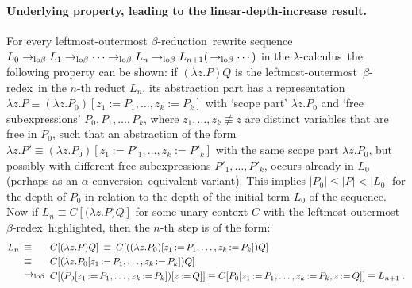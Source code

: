 \documentclass[
submission
]{dmtcs-episciences-tampered}
\newcommand{\indap}[2]{#1 _{#2}}
\newcommand{\nb}{\nobreakdash}
\newcommand{\nf}{\normalfont}
\newcommand{\sdefdby}{{:=}}
\newcommand{\punc}[1]{\ensuremath{\hspace*{3pt}{#1}}}
\newcommand{\cvar}{z}
\newcommand{\cvari}{\indap{\cvar}}
\newcommand{\cxtap}[2]{{#1}[#2]}
\newcommand{\acxt}{C}
\newcommand{\acxtap}{\cxtap{\acxt}}
\newcommand{\sdepth}{\text{\nf d}}
\newcommand{\depth}[1]{\lvert{#1}\rvert} \newcommand{\depthbig}[1]{\big\lvert{#1}\big\rvert} \newcommand{\sudepth}{\indap{\sdepth}{\text{\nf u}}}
\newcommand{\clter}{L}
\newcommand{\dlter}{P}
\newcommand{\elter}{Q}
\newcommand{\dlteracc}{\dlter'}
\newcommand{\clteri}{\indap{\clter}}
\newcommand{\dlteri}{\indap{\dlter}}
\newcommand{\dlteracci}{\indap{\dlteracc}}
\newcommand{\sslabs}{\lambda}
\newcommand{\slabs}[1]{\sslabs{#1}.}
\newcommand{\labs}[2]{\slabs{#1}{#2}}
\newcommand{\lapp}[2]{{#1}{#2}}
\newcommand{\substin}[2]{{#1}[{#2}]}
\newcommand{\sred}{\to}
\newcommand{\sredi}{\indap{\sred}}
\newcommand{\ssyntequal}{{\equiv}}
\newcommand{\syntequal}{\mathrel{\ssyntequal}}
\newcommand{\snotsyntequal}{{\not\equiv}}
\newcommand{\notsyntequal}{\mathrel{\snotsyntequal}}
\newcommand{\scriptlobeta}{\text{\nf lo}\beta}
\newcommand{\slobetared}{\sredi{\scriptlobeta}}
\newcommand{\lobetared}{\mathrel{\slobetared}}
\newcommand{\lambdacalculus}{$\lambda$\nb-cal\-cu\-lus}
\newcommand{\betareduction}{$\beta$\nb-re\-duc\-tion}
\newcommand{\betaredex}{$\beta$\nb-re\-dex}
\newcommand{\alphaconversion}{$\alpha$\nb-con\-ver\-sion}
\newcommand{\lo}{left\-most-outer\-most}
\theoremstyle{plain}
\theoremstyle{definition}
\begin{document}
\paragraph{Underlying property, leading to the linear-depth-increase result.}
  For every leftmost-outermost \betareduction\ rewrite sequence 
  $\clteri{0} \lobetared \clteri{1} \lobetared \cdots \lobetared \clteri{n} \lobetared \clteri{n+1} (\,\lobetared \cdots)$
  in the \lambdacalculus\ the following property can be shown:
  if $\lapp{(\labs{\cvar}{\dlter})}{\elter}$ is the \lo\ \betaredex\ in the $n$\nb-th reduct $\clteri{n}$,
  its abstraction part has a representation
  $ \labs{\cvar}{\dlter} 
      \syntequal
    \substin{(\labs{\cvar}{\dlteri{0}})}{\cvari{1}\sdefdby\dlteri{1},\ldots,\cvari{k}\sdefdby\dlteri{k}} $  
  with `scope part' $\labs{\cvar}{\dlteri{0}}$ and `free subexpressions' $\dlteri{0},\dlteri{1},\ldots,\dlteri{k}$,
  where $\cvari{1},\ldots,\cvari{k}\notsyntequal\cvar$ are distinct variables that are free in $\dlteri{0}$, 
  such that an abstraction of the form
  $ \labs{\cvar}{\dlteracc} 
      \syntequal
    \substin{(\labs{\cvar}{\dlteri{0}})}{\cvari{1}\sdefdby\dlteracci{1},\ldots,\cvari{k}\sdefdby\dlteracci{k}} $
  with the same scope part $\labs{\cvar}{\dlteri{0}}$, but possibly with different free subexpressions $\dlteracci{1},\ldots,\dlteracci{k}$,   
  occurs already in $\clteri{0}$ (perhaps as an \alphaconversion\ equivalent variant).
  This implies $\depth{\dlteri{0}} \le \depth{\dlter} < \depth{\clteri{0}}$
  for the depth of $\dlteri{0}$ in relation to the depth of the initial term $\clteri{0}$ of the sequence.
  Now if $\clteri{n} \syntequal \acxtap{(\lapp{\labs{\cvar}{\dlter})}{\elter}}$ for some unary context $\acxt$
  with the \lo\ \betaredex\ highlighted, then the $n$\nb-th step is of the form:
  \begin{equation*}
    \begin{split}
      \clteri{n} 
        & {} \parbox{\widthof{${}\:\lobetared\:{}$}}{${}\:\syntequal\:{}$}
      \acxtap{\lapp{(\labs{\cvar}{\dlter})}{\elter}} 
        \:\syntequal\:
      \acxtap{\lapp{(\substin{(\labs{\cvar}{\dlteri{0}})}{\cvari{1}\,\sdefdby\,\dlteri{1},\ldots,\cvari{k}\,\sdefdby\,\dlteri{k}})}{\elter}}
      \\
        & {} \parbox{\widthof{${}\:\lobetared\:{}$}}{${}\:\syntequal\:{}$}
      \acxtap{\lapp{(\labs{\cvar}{\substin{\dlteri{0}}{\cvari{1}\,\sdefdby\,\dlteri{1},\ldots,\cvari{k}\,\sdefdby\,\dlteri{k}}})}{\elter}}  
      \\
        & {} \parbox{\widthof{${}\:\lobetared\:{}$}}{${}\:\lobetared\:{}$}
      \acxtap{\substin{(\substin{\dlteri{0}}{\cvari{1}\,\sdefdby\,\dlteri{1},\ldots,\cvari{k}\,\sdefdby\,\dlteri{k}})}{\cvar\,\sdefdby\,\elter}}
\syntequal
      \acxtap{\substin{\dlteri{0}}{\cvari{1}\,\sdefdby\,\dlteri{1},\ldots,\cvari{k}\,\sdefdby\,\dlteri{k},\cvar\,\sdefdby\,\elter}}
        \syntequal
      \clteri{n+1} \punc{.}       
    \end{split} 
  \end{equation*}
\end{document}

